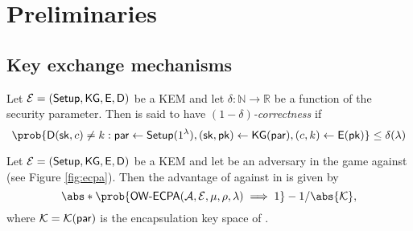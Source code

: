 
\section{Preliminaries}

\subsection{Key exchange mechanisms}


\begin{definition}\label{def:corr}
  Let \(\mathcal{E} = (\mathsf{Setup}, \mathsf{KG}, \mathsf{E}, \mathsf{D})\) be a KEM
  and let \(\delta : \mathbb{N} \to \mathbb{R}\) be a function of the security parameter.
  Then \KEM is said to have \emph{\((1-\delta)\)-correctness} if
  \begin{equation}
    \prob{\Decaps{}(\sk,c) \ne k : \params \assign \Setup{}(1^{\lambda}), (\sk,\pk) \assign \KG{}(\params), (c,k) \assign \Encaps{}(\pk)} \le \delta (\lambda)
  \end{equation}
\end{definition}


\begin{definition}\label{def:OWECPA_sec}
  Let \(\mathcal{E} = (\mathsf{Setup}, \mathsf{KG}, \mathsf{E}, \mathsf{D})\) be a KEM
  and let \advA{} be an adversary in the \OWECPA{} game against \KEM (see Figure \ref{fig:ecpa}).
  Then the advantage of \advA{} against \OWECPA in \KEM is given by
  \begin{equation}
    \abs*{\prob{\OWECPA{}(\advA,\KEM,\mu,\rho,\lambda) \implies 1} - 1/\abs{\keyspace}},
  \end{equation}
  where \(\mathcal{K} = \mathcal{K}{}(\mathsf{par})\) is the encapsulation key space of \KEM.
\end{definition}

